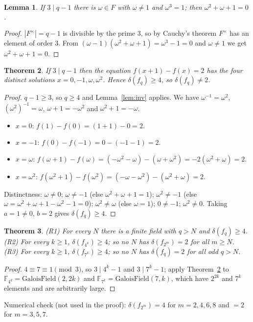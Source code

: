 \documentclass[11pt]{article}
\newtheorem{theorem}{Theorem}
\newtheorem{lemma}[theorem]{Lemma}
\theoremstyle{definition}
\begin{document}
\begin{lemma}\label{lem:omega}
If $3\mid q-1$ there is $\omega\in F$ with $\omega\ne1$ and $\omega^3=1$; then
$\omega^2+\omega+1=0$.
\end{lemma}
\begin{proof}
$|F^\times|=q-1$ is divisible by the prime $3$, so by Cauchy's theorem $F^\times$ has an element
of order $3$. From $(\omega-1)(\omega^2+\omega+1)=\omega^3-1=0$ and $\omega\ne1$ we get
$\omega^2+\omega+1=0$.
\end{proof}

\begin{theorem}\label{thm:main}
If $3\mid q-1$ then the equation $f(x+1)-f(x)=2$ has the four distinct solutions
$x=0,-1,\omega,\omega^2$. Hence $\delta(f_q)\ge4$, so $\delta(f_q)\ne2$.
\end{theorem}
\begin{proof}
$q-1\ge3$, so $q\ge4$ and Lemma~\ref{lem:inv} applies. We have $\omega^{-1}=\omega^2$,
$(\omega^2)^{-1}=\omega$, $\omega+1=-\omega^2$ and $\omega^2+1=-\omega$.
\begin{itemize}
\item $x=0$: $f(1)-f(0)=(1+1)-0=2$.
\item $x=-1$: $f(0)-f(-1)=0-(-1-1)=2$.
\item $x=\omega$: $f(\omega+1)-f(\omega)=(-\omega^2-\omega)-(\omega+\omega^2)
  =-2(\omega^2+\omega)=2$.
\item $x=\omega^2$: $f(\omega^2+1)-f(\omega^2)=(-\omega-\omega^2)-(\omega^2+\omega)=2$.
\end{itemize}
Distinctness: $\omega\ne0$; $\omega\ne-1$ (else $\omega^2+\omega+1=1$); $\omega^2\ne-1$
(else $\omega=\omega^2+\omega+1-\omega^2-1=0$); $\omega^2\ne\omega$ (else $\omega=1$);
$0\ne-1$; $\omega^2\ne0$. Taking $a=1\ne0$, $b=2$ gives $\delta(f_q)\ge4$.
\end{proof}

\begin{theorem}
(R1) For every $N$ there is a finite field with $q>N$ and $\delta(f_q)\ge4$.
(R2) For every $k\ge1$, $\delta(f_{4^k})\ge4$; so no $N$ has $\delta(f_{2^m})=2$ for all
$m\ge N$. (R3) For every $k\ge1$, $\delta(f_{7^k})\ge4$; so no $N$ has $\delta(f_q)=2$ for all
odd $q>N$.
\end{theorem}
\begin{proof}
$4\equiv7\equiv1\pmod 3$, so $3\mid 4^k-1$ and $3\mid 7^k-1$; apply Theorem~\ref{thm:main} to
$\mathbb F_{4^k}=\mathrm{GaloisField}(2,2k)$ and $\mathbb F_{7^k}=\mathrm{GaloisField}(7,k)$,
which have $2^{2k}$ and $7^k$ elements and are arbitrarily large.
\end{proof}
Numerical check (not used in the proof): $\delta(f_{2^m})=4$ for $m=2,4,6,8$ and $=2$ for
$m=3,5,7$.
\end{document}
